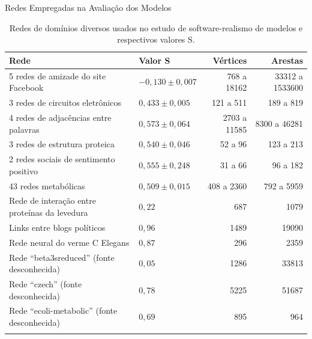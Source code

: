 \begin{chapter}{Redes Empregadas na Avaliação dos Modelos}
\begin{center}
\begin{longtable}{| p{6cm} | l | r | r | }
	\hline
	\textbf{Rede} & \textbf{Valor} S & \textbf{Vértices} & \textbf{Arestas} \\ \hline
	\hline
	5 redes de amizade do site Facebook \cite{Traud2008} & $-0,130 \pm 0,007$ & 768 a 18162 & 33312 a 1533600 \\ \hline
	3 redes de circuitos eletrônicos \cite{Milo2004} & $0,433 \pm 0,005$ & 121 a 511 & 189 a 819 \\ \hline
	4 redes de adjacências entre palavras \cite{Milo2004} & $0,573 \pm 0,064$ & 2703 a 11585 & 8300 a 46281 \\ \hline
	3 redes de estrutura proteica \cite{Milo2004} & $0,540 \pm 0,046$ & 52 a 96 & 123 a 213 \\ \hline
	2 redes sociais de sentimento positivo \cite{Milo2004} & $0,555 \pm 0,248$ & 31 a 66 & 96 a 182 \\ \hline
	43 redes metabólicas \cite{Jeong2000} & $0,509 \pm 0,015$ & 408 a 2360 & 792 a 5959 \\ \hline
	Rede de interação entre proteínas da levedura \cite{Jeong2001} & $0,22$ & 687 & 1079 \\ \hline
	Links entre blogs políticos \cite{Adamic2005} & $0,96$ & 1489 & 19090 \\ \hline
	Rede neural do verme C Elegans \cite{Watts1998} & $0,87$ & 296 & 2359 \\ \hline
	Rede ``beta3sreduced'' (fonte desconhecida) & $0,05$ & 1286 & 33813 \\ \hline
	Rede ``czech'' (fonte desconhecida) & $0,78$ & 5225 & 51687 \\  \hline
	Rede ``ecoli-metabolic'' (fonte desconhecida) & $0,69$ & 895 & 964 \\ \hline
	
	\caption{\label{tab:redes-outros}Redes de domínios diversos usados no estudo de software-realismo de modelos e respectivos valores S.}
\end{longtable}
\end{center}

\end{chapter}

